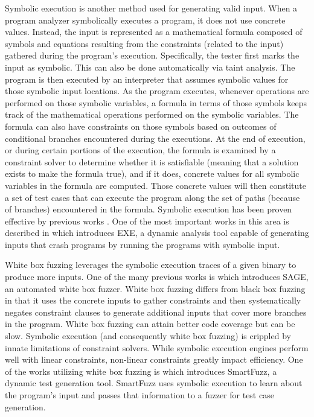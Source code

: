 \documentclass{sig-alternate-05-2015}
\begin{document}
Symbolic execution is another method used for generating valid input.
When a program analyzer symbolically executes a program, it does not use concrete values.
Instead, the input is represented as a mathematical formula composed of symbols and equations resulting from the constraints (related to the input) gathered during the program's execution.
Specifically, the tester first marks the input as symbolic.
This can also be done automatically via taint analysis.
The program is then executed by an interpreter that assumes symbolic values for those symbolic input locations.
As the program executes, whenever operations are performed on those symbolic variables, a formula in terms of those symbols keeps track of the mathematical operations performed on the symbolic variables.
The formula can also have constraints on those symbols based on outcomes of conditional branches encountered during the executions.
At the end of execution, or during certain portions of the execution, the formula is examined by a constraint solver to determine whether it is satisfiable (meaning that a solution exists to make the formula true), and if it does, concrete values for all symbolic variables in the formula are computed.
Those concrete values will then constitute a set of test cases that can execute the program along the set of paths (because of branches) encountered in the formula.
Symbolic execution has been proven effective by previous works \cite{symbolicexecution, exesymex}.
One of the most important works in this area is described in \cite{exesymex} which introduces EXE, a dynamic analysis tool capable of generating inputs that crash programs by running the programs with symbolic input.

White box fuzzing leverages the symbolic execution traces of a given binary to produce more inputs.
One of the many previous works is \cite{godefroid2008automated} which introduces SAGE, an automated white box fuzzer.
White box fuzzing differs from black box fuzzing in that it uses the concrete inputs to gather constraints and then systematically negates constraint clauses to generate additional inputs that cover more branches in the program.
White box fuzzing can attain better code coverage but can be slow.
Symbolic execution (and consequently white box fuzzing) is crippled by innate limitations of constraint solvers.
While symbolic execution engines perform well with linear constraints, non-linear constraints greatly impact efficiency.
One of the works utilizing white box fuzzing is \cite{molnar2009dynamic} which introduces SmartFuzz, a dynamic test generation tool.
SmartFuzz uses symbolic execution to learn about the program's input and passes that information to a fuzzer for test case generation.
\end{document}
